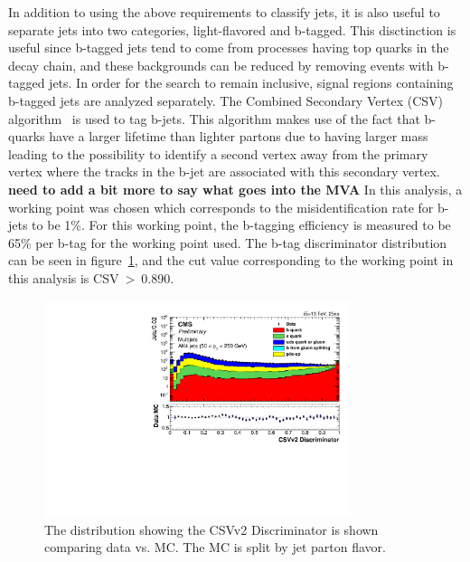 In addition to using the above requirements to classify jets, it is also useful to separate jets into two categories, light-flavored and b-tagged.
This disctinction is useful since b-tagged jets tend to come from processes having top quarks in the decay chain,
and these backgrounds can be reduced by removing events with b-tagged jets.
In order for the search to remain inclusive, signal regions containing b-tagged jets are analyzed separately.
The Combined Secondary Vertex (CSV) algorithm~\cite{btagging} is used to tag b-jets.
This algorithm makes use of the fact that b-quarks have a larger lifetime than lighter partons due to having larger mass
leading to the possibility to identify a second vertex away from the primary vertex where the tracks in the b-jet are associated with this secondary vertex.
{\bf need to add a bit more to say what goes into the MVA}
In this analysis, a working point was chosen which corresponds to the misidentification rate for b-jets to be 1\%.
For this working point, the b-tagging efficiency is measured to be 65\% per b-tag for the working point used. 
The b-tag discriminator distribution can be seen in figure~\ref{fig:csv},
and the cut value corresponding to the working point in this analysis is CSV$~>~$0.890.

\begin{figure}[!ht]
  \begin{center}
      \includegraphics[width=0.8\textwidth]{evtsel/figs/ak4Inclusive_CSVIVF_Log.pdf}
    \caption{
      The distribution showing the CSVv2 Discriminator is shown comparing data vs. MC.
      The MC is split by jet parton flavor.
      \label{fig:csv}
    }
  \end{center}
\end{figure}

